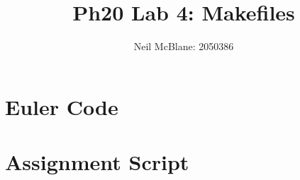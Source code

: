 \documentclass{article}
\begin{document}
\title{Ph20 Lab 4: Makefiles}
\author{Neil McBlane: 2050386}

\maketitle

\section*{Euler Code}

\clearpage

\section*{Assignment Script}

\end{document}

